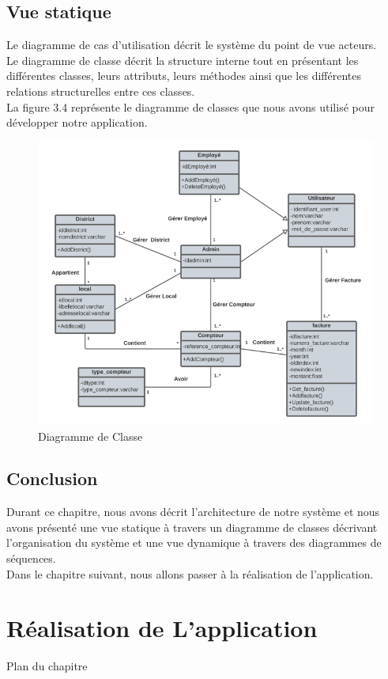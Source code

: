 \documentclass[12pt]{report}
\begin{document}
\section{Vue statique}
Le diagramme de cas d'utilisation décrit le système du point de vue acteurs.\\ Le diagramme de classe décrit la structure interne tout en présentant les différentes classes, leurs attributs, leurs méthodes ainsi que les différentes relations structurelles entre ces classes.\\ La figure 3.4 représente le diagramme de classes que nous avons utilisé pour développer notre application.
\begin{figure}[H]
  \centering
  \includegraphics[width=19cm]{diagclasse2}
  \caption{ Diagramme de Classe}
  \label{fig:votre-label}
\end{figure}
\section*{Conclusion}

Durant ce chapitre, nous avons décrit l'architecture de notre système et nous avons présenté une vue statique à travers un diagramme de classes décrivant l'organisation du système et une vue dynamique à travers des diagrammes de séquences.
\\
Dans le chapitre suivant, nous allons passer à la réalisation de l'application.

\chapter{Réalisation de L'application}
\vspace{100pt}
\begin{center}
Plan du chapitre
\end{center}
\end{document}
